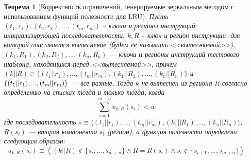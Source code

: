 \documentclass[14pt]{extreport}
\newtheorem{theorem}{Теорема}
\newcommand{\LRU}{\textsf{LRU}\xspace}
\begin{document}
\begin{theorem}[Корректность ограничений, генерируемые зеркальным методом с
использованием функций полезности для
\LRU]\label{correct_mirror_LRU} Пусть $(t_1, r_1), (t_2,r_2), ..., (t_m,r_m)$ -- ключи и регионы инструкций инициализирующей последовательности, $k, R$ -- ключ и регион инструкции, для которой описывается вытеснение (будем ее называть <<вытесняемой>>), $(k_1,R_1), (k_2,R_2), ..., (k_n,R_n)$ --- ключи и регионы инструкций тестового шаблона, находящихся перед <<вытесняемой>>, причем $(k||R) \in \{(t_1||r_1), ..., (t_m||r_m), (k_1||R_1), ..., (k_n||R_n)\}$ и
$\{(t_1||r_1), ...,\\(t_m||r_m)\}$ --- все разные. Тогда $k$ не вытеснен из региона $R$ согласно определению на списках тогда и только тогда, когда
$$\sum\limits_{i=1}^{m+n} u_{k,R}(s_i) < w$$
где последовательность $s \equiv \langle (t_1||r_1), ..., (t_m||r_m), (k_1||R_1), ...,
(k_n||R_n)\rangle$, $R(s_i)$ --- вторая компонента $s_i$ (регион), а функция полезности определена следующим образом:
$$u_{k,R}(s_i) \equiv ((k||R) \notin \{s_i, ..., s_{m+n}\} \wedge
R = R(s_i) \wedge s_i \notin\{s_{i+1},..., s_{m+n}\})$$


\end{theorem}
\end{document}

